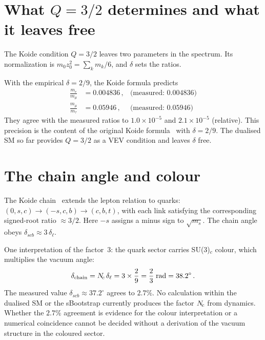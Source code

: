 \documentclass[11pt,a4paper]{article}
\begin{document}
\section{What \texorpdfstring{$Q = 3/2$}{Q = 3/2} determines and what it leaves free}
\label{sec:spectrum}

The Koide condition $Q = 3/2$ leaves two parameters in the spectrum.
Its normalization is $m_0z_0^2=\sum_k m_k/6$, and $\delta$ sets the ratios.

With the empirical $\delta = 2/9$, the Koide formula predicts
\begin{align}
  \frac{m_e}{m_\mu} &= 0.004836\,,
  & \text{(measured: } 0.004836\text{)} \\
  \frac{m_\mu}{m_\tau} &= 0.05946\,,
  & \text{(measured: } 0.05946\text{)}
\end{align}
They agree with the measured ratios to $1.0\times10^{-5}$ and
$2.1\times10^{-5}$ (relative).  This precision is the content of the
original Koide formula~\cite{Koide1983} with $\delta = 2/9$.  The
dualised SM so far provides $Q = 3/2$ as a VEV condition and leaves
$\delta$ free.

\section{The chain angle and colour}
\label{sec:chain}

The Koide chain~\cite{Rivero2013,Zenczykowski2012}
extends the lepton relation to quarks:
$(0,s,c) \to (-s,c,b) \to (c,b,t)$, with each link
satisfying the corresponding signed-root ratio $\approx 3/2$.
Here $-s$ assigns a minus sign to $\sqrt{m_s}$.  The chain angle obeys
$\delta_{scb} \approx 3\,\delta_\ell$.

One interpretation of the factor~$3$: the quark sector carries
SU(3)$_c$ colour, which multiplies the vacuum angle:
\begin{equation}
  \delta_{\text{chain}} = N_{\!c}\,\delta_\ell
  = 3\times\frac{2}{9} = \frac{2}{3}\;\text{rad}
  = 38.2^\circ\,.
  \label{eq:chain-angle}
\end{equation}
The measured value $\delta_{scb} \approx 37.2^\circ$ agrees
to $2.7\%$.  No calculation within the dualised SM or the
sBootstrap currently produces the factor $N_{\!c}$ from dynamics.
Whether the $2.7\%$ agreement is evidence for the colour
interpretation or a numerical coincidence cannot be decided
without a derivation of the vacuum structure in the coloured
sector.
\end{document}
